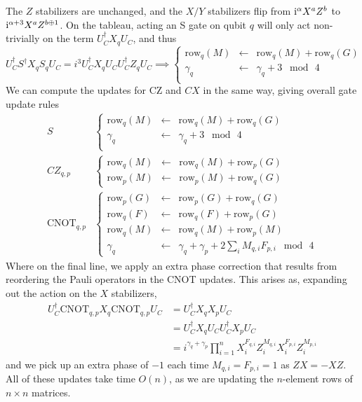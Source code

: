 The $Z$ stabilizers are unchanged, and the $X/Y$ stabilizers flip from $\mathrm{i}^{\alpha}X^{a}Z^{b}$ to $\mathrm{i}^{\alpha+3}X^{a}Z^{b\oplus 1}$. On the tableau, acting an S gate on qubit $q$ will only act non-trivially on the term $U_{C}^{\dagger}X_{q}U_{C}$, and thus
\[
U_{C}^{\dagger}S^{\dagger}X_{q}S_{q}U_{C} = i^{3}U_{C}^{\dagger}X_{q}U_{C}U_{C}^{\dagger}Z_{q}U_{C} \implies \left\{
\begin{array}{rcl}
\text{row}_{q}(M)  & \gets & \text{row}_{q}(M)+\text{row}_{q}(G) \\
\gamma_{q} & \gets & \gamma_{q} + 3\;\bmod\,4 \\
\end{array}\right.
\]
We can compute the updates for CZ and $CX$ in the same way, giving overall gate update rules
\begin{align}
S & \left\{
\begin{array}{rcl}
\text{row}_{q}(M)  & \gets & \text{row}_{q}(M)+\text{row}_{q}(G) \\
\gamma_{q} & \gets & \gamma_{q} + 3\;\bmod\,4 \\
\end{array}\right. \nonumber \\
CZ_{q,p} & \left\{
\begin{array}{rcl}
\text{row}_{q}(M) & \gets & \text{row}_{q}(M) + \text{row}_{p}(G) \\
\text{row}_{p}(M) & \gets & \text{row}_{p}(M) + \text{row}_{q}(G)
\end{array} \right. \nonumber \\ 
\text{CNOT}_{q,p} & \left\{
\begin{array}{rcl}
\text{row}_{p}(G) & \gets & \text{row}_{p}(G) + \text{row}_{q}(G)\\
\text{row}_{q}(F) & \gets & \text{row}_{q}(F) + \text{row}_{p}(G)\\
\text{row}_{q}(M) & \gets & \text{row}_{q}(M) + \text{row}_{p}(M)\\
\gamma_{q} & \gets & \gamma_{q}+\gamma_{p} + 2 \sum_{i}M_{q,i}F_{p,i} \;\bmod\,4
\end{array}\right.
\end{align}
Where on the final line, we apply an extra phase correction that results from reordering the Pauli operators in the CNOT updates. This arises as, expanding out the action on the $X$ stabilizers,
\begin{align*}
U_{C}^{\dagger}\text{CNOT}_{q,p}X_{q}\text{CNOT}_{q,p}U_{C} &= U_{C}^{\dagger}X_{q}X_{p}U_{C} \\
&= U_{C}^{\dagger}X_{q}U_{C}U_{C}^{\dagger}X_{p}U_{C} \\
&= i^{\gamma_{q}+\gamma_{p}}\prod_{i=1}^{n}X_{i}^{F_{q,i}}Z_{i}^{M_{q,i}}X_{i}^{F_{p,i}}Z_{i}^{M_{p,i}}
\end{align*}
and we pick up an extra phase of $-1$ each time $M_{q,i}=F_{p,i}=1$ as $ZX=-XZ$. All of these updates take time $O(n)$, as we are updating the $n$-element rows of $n\times n$ matrices.
